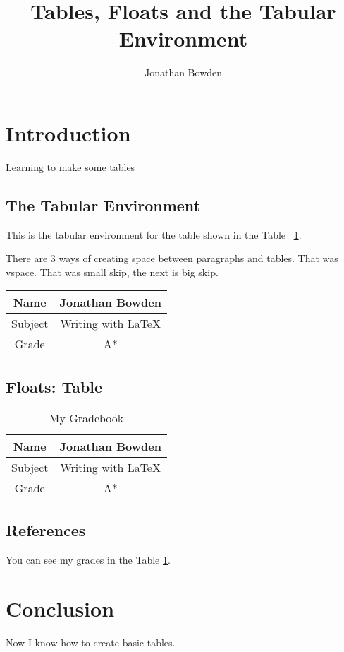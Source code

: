 \documentclass{article}
\title{Tables, Floats and the Tabular Environment}
\author{Jonathan Bowden}
\begin{document}
\maketitle

\section{Introduction}
Learning to make some tables

\subsection{The Tabular Environment}

This is the tabular environment for the table shown in the Table ~\ref{tab:grades}.

\noindent There are 3 ways of creating space between paragraphs and tables.
\vspace{0.2cm} %
\noindent That was vspace.
\smallskip
\noindent That was small skip, the next is big skip.
\bigskip


\begin{tabular}{|c||c|}  %
	\hline
	Name& Jonathan Bowden\\
	\hline
	Subject& Writing with \LaTeX \\
	\hline
	Grade& A* \\
	\hline
\end{tabular}

\subsection{Floats: Table}

\begin{table}[htbp] %
	\caption{My Gradebook}	
	\begin{center}
		\begin{tabular}{|c||c|}
			\hline
			Name& Jonathan Bowden\\
			\hline
			Subject& Writing with \LaTeX \\
			\hline
			Grade& A* \\
			\hline
		\end{tabular}
	\end{center}
	\label{tab:grades}
\end{table}

\subsection{References}

You can see my grades in the Table \ref{tab:grades}.  %

\section{Conclusion}

Now I know how to create basic tables.
\end{document}
